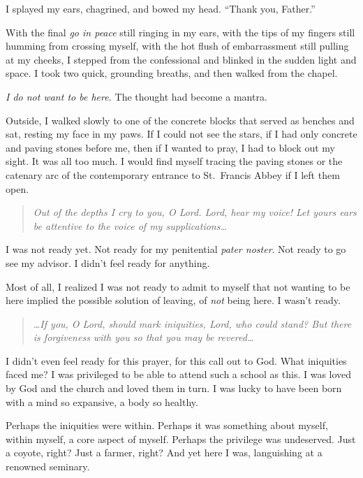 I splayed my ears, chagrined, and bowed my head. ``Thank you, Father.''

With the final \emph{go in peace} still ringing in my ears, with the tips of my fingers still humming from crossing myself, with the hot flush of embarrassment still pulling at my cheeks, I stepped from the confessional and blinked in the sudden light and space. I took two quick, grounding breaths, and then walked from the chapel.

\emph{I do not want to be here.} The thought had become a mantra.

Outside, I walked slowly to one of the concrete blocks that served as benches and sat, resting my face in my paws. If I could not see the stars, if I had only concrete and paving stones before me, then if I wanted to pray, I had to block out my sight. It was all too much. I would find myself tracing the paving stones or the catenary arc of the contemporary entrance to St.~Francis Abbey if I left them open.

\begin{quote}
\emph{Out of the depths I cry to you, O Lord. Lord, hear my voice! Let yours ears be attentive to the voice of my supplications\ldots{}}
\end{quote}

I was not ready yet. Not ready for my penitential \emph{pater noster}. Not ready to go see my advisor. I didn't feel ready for anything.

Most of all, I realized I was not ready to admit to myself that not wanting to be here implied the possible solution of leaving, of \emph{not} being here. I wasn't ready.

\begin{quote}
\emph{\ldots If you, O Lord, should mark iniquities, Lord, who could stand? But there is forgiveness with you so that you may be revered\ldots{}}
\end{quote}

I didn't even feel ready for this prayer, for this call out to God. What iniquities faced me? I was privileged to be able to attend such a school as this. I was loved by God and the church and loved them in turn. I was lucky to have been born with a mind so expansive, a body so healthy.

Perhaps the iniquities were within. Perhaps it was something about myself, within myself, a core aspect of myself. Perhaps the privilege was undeserved. Just a coyote, right? Just a farmer, right? And yet here I was, languishing at a renowned seminary.

